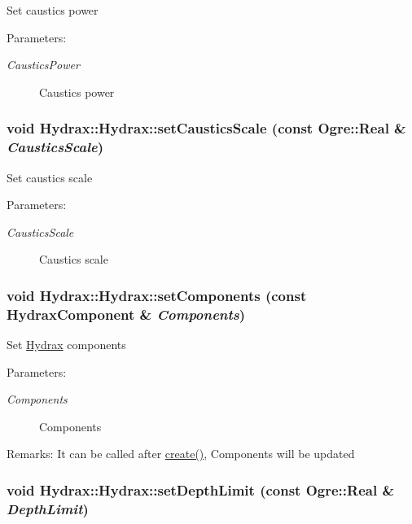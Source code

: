 Set caustics power \begin{Desc}
\item[Parameters:]
\begin{description}
\item[{\em CausticsPower}]Caustics power \end{description}
\end{Desc}
\hypertarget{class_hydrax_1_1_hydrax_a0d4bb8262e28ef9e6ff273503266889}{
\subsubsection[{setCausticsScale}]{\setlength{\rightskip}{0pt plus 5cm}void Hydrax::Hydrax::setCausticsScale (const Ogre::Real \& {\em CausticsScale})}}
\label{class_hydrax_1_1_hydrax_a0d4bb8262e28ef9e6ff273503266889}


Set caustics scale \begin{Desc}
\item[Parameters:]
\begin{description}
\item[{\em CausticsScale}]Caustics scale \end{description}
\end{Desc}
\hypertarget{class_hydrax_1_1_hydrax_6fbd6d0808443ba1d2d7569ac6b27583}{
\subsubsection[{setComponents}]{\setlength{\rightskip}{0pt plus 5cm}void Hydrax::Hydrax::setComponents (const {\bf HydraxComponent} \& {\em Components})}}
\label{class_hydrax_1_1_hydrax_6fbd6d0808443ba1d2d7569ac6b27583}


Set \hyperlink{class_hydrax_1_1_hydrax}{Hydrax} components \begin{Desc}
\item[Parameters:]
\begin{description}
\item[{\em Components}]Components \end{description}
\end{Desc}
\begin{Desc}
\item[Remarks:]It can be called after \hyperlink{class_hydrax_1_1_hydrax_af840e19208614533a6b344e32965ee2}{create()}, Components will be updated \end{Desc}
\hypertarget{class_hydrax_1_1_hydrax_83f64aa230e64e83d9732290b50f3787}{
\subsubsection[{setDepthLimit}]{\setlength{\rightskip}{0pt plus 5cm}void Hydrax::Hydrax::setDepthLimit (const Ogre::Real \& {\em DepthLimit})}}
\label{class_hydrax_1_1_hydrax_83f64aa230e64e83d9732290b50f3787}


